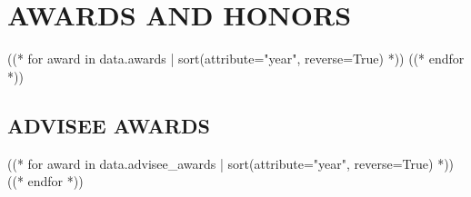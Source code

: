 \section{AWARDS AND HONORS}

\begin{alignedentrieshang}
((* for award in data.awards | sort(attribute="year", reverse=True) *))
((* endfor *))
\end{alignedentrieshang}

\subsection{ADVISEE AWARDS}

\begin{alignedentrieshang}
((* for award in data.advisee_awards | sort(attribute="year", reverse=True) *))
((* endfor *))
\end{alignedentrieshang}
